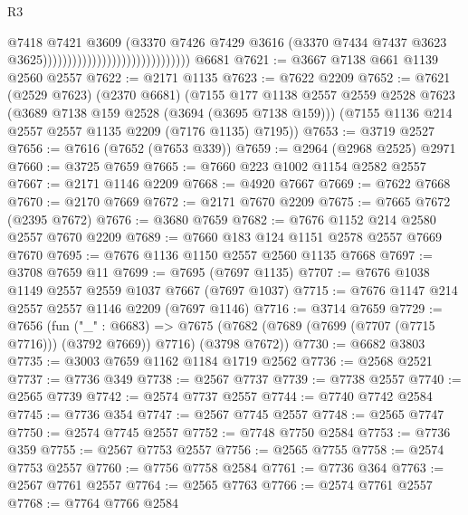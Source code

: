\begin{lexlean}{R3}
\begin{coremodule}
                                                            @7418
                                                            @7421
                                                            @3609
                                                            (@3370
                                                              @7426
                                                              @7429
                                                              @3616
                                                              (@3370
                                                                @7434
                                                                @7437
                                                                @3623
                                                                @3625))))))))))))))))))))))))))))))
    @6681
@7621 := @3667 @7138 @661 @1139 @2560 @2557
@7622 := @2171 @1135
@7623 := @7622 @2209
@7652 := @7621
    (@2529 @7623)
    (@2370 @6681)
    (@7155
      @177
      @1138
      @2557
      @2559
      @2528
      @7623
      (@3689 @7138 @159 @2528 (@3694 (@3695 @7138 @159)))
      (@7155 @1136 @214 @2557 @2557 @1135 @2209 (@7176 @1135) @7195))
@7653 := @3719 @2527
@7656 := @7616 (@7652 (@7653 @339))
@7659 := @2964 (@2968 @2525) @2971
@7660 := @3725 @7659
@7665 := @7660 @223 @1002 @1154 @2582 @2557
@7667 := @2171 @1146 @2209
@7668 := @4920 @7667
@7669 := @7622 @7668
@7670 := @2170 @7669
@7672 := @2171 @7670 @2209
@7675 := @7665 @7672 (@2395 @7672)
@7676 := @3680 @7659
@7682 := @7676 @1152 @214 @2580 @2557 @7670 @2209
@7689 := @7660 @183 @124 @1151 @2578 @2557 @7669 @7670
@7695 := @7676 @1136 @1150 @2557 @2560 @1135 @7668
@7697 := @3708 @7659 @11
@7699 := @7695 (@7697 @1135)
@7707 := @7676 @1038 @1149 @2557 @2559 @1037 @7667 (@7697 @1037)
@7715 := @7676 @1147 @214 @2557 @2557 @1146 @2209 (@7697 @1146)
@7716 := @3714 @7659
@7729 := @7656
    (fun ("_" : @6683) =>
    @7675 (@7682 (@7689 (@7699 (@7707 (@7715 @7716))) (@3792 @7669)) @7716) (@3798 @7672))
@7730 := @6682 @3803
@7735 := @3003 @7659 @1162 @1184 @1719 @2562
@7736 := @2568 @2521
@7737 := @7736 @349
@7738 := @2567 @7737
@7739 := @7738 @2557
@7740 := @2565 @7739
@7742 := @2574 @7737 @2557
@7744 := @7740 @7742 @2584
@7745 := @7736 @354
@7747 := @2567 @7745 @2557
@7748 := @2565 @7747
@7750 := @2574 @7745 @2557
@7752 := @7748 @7750 @2584
@7753 := @7736 @359
@7755 := @2567 @7753 @2557
@7756 := @2565 @7755
@7758 := @2574 @7753 @2557
@7760 := @7756 @7758 @2584
@7761 := @7736 @364
@7763 := @2567 @7761 @2557
@7764 := @2565 @7763
@7766 := @2574 @7761 @2557
@7768 := @7764 @7766 @2584

\end{coremodule}
\end{lexlean}
